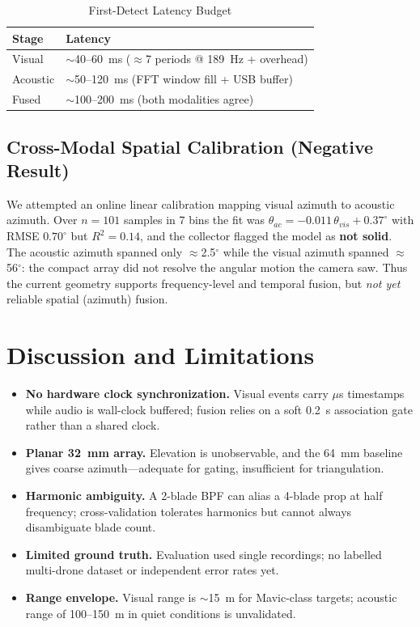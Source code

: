 \documentclass[conference]{IEEEtran}
\begin{document}
\begin{table}[t]
\caption{First-Detect Latency Budget}
\label{tab:latency}
\centering
\begin{tabular}{@{}ll@{}}
\toprule
\textbf{Stage} & \textbf{Latency} \\
\midrule
Visual   & $\sim$40--60~ms ($\approx$7 periods @ 189~Hz + overhead) \\
Acoustic & $\sim$50--120~ms (FFT window fill + USB buffer) \\
Fused    & $\sim$100--200~ms (both modalities agree) \\
\bottomrule
\end{tabular}
\end{table}

\subsection{Cross-Modal Spatial Calibration (Negative Result)}
We attempted an online linear calibration mapping visual azimuth to acoustic
azimuth. Over $n=101$ samples in 7 bins the fit was
$\theta_{ac} = -0.011\,\theta_{vis} + 0.37^{\circ}$ with RMSE $0.70^{\circ}$
but $R^{2}=0.14$, and the collector flagged the model as \textbf{not solid}.
The acoustic azimuth spanned only $\approx$2.5$^{\circ}$ while the visual
azimuth spanned $\approx$56$^{\circ}$: the compact array did not resolve the
angular motion the camera saw. Thus the current geometry supports
frequency-level and temporal fusion, but \emph{not yet} reliable spatial
(azimuth) fusion.

\section{Discussion and Limitations}
\label{sec:discussion}
\begin{itemize}
\item \textbf{No hardware clock synchronization.} Visual events carry
$\mu$s timestamps while audio is wall-clock buffered; fusion relies on a soft
0.2~s association gate rather than a shared clock.
\item \textbf{Planar 32~mm array.} Elevation is unobservable, and the 64~mm
baseline gives coarse azimuth---adequate for gating, insufficient for
triangulation.
\item \textbf{Harmonic ambiguity.} A 2-blade BPF can alias a 4-blade prop at
half frequency; cross-validation tolerates harmonics but cannot always
disambiguate blade count.
\item \textbf{Limited ground truth.} Evaluation used single recordings; no
labelled multi-drone dataset or independent error rates yet.
\item \textbf{Range envelope.} Visual range is $\sim$15~m for Mavic-class
targets; acoustic range of 100--150~m in quiet conditions is unvalidated.
\end{itemize}
\end{document}
